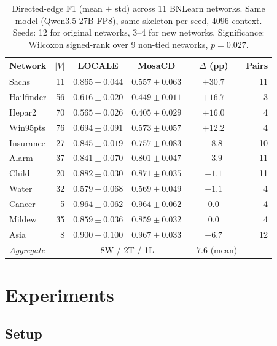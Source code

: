 \documentclass{article} %
\begin{document}
\begin{table}[t]
\centering
\caption{Directed-edge F1 (mean $\pm$ std) across 11 BNLearn networks. Same model (Qwen3.5-27B-FP8), same skeleton per seed, 4096 context. Seeds: 12 for original networks, 3--4 for new networks. Significance: Wilcoxon signed-rank over 9 non-tied networks, $p{=}0.027$.}
\label{tab:main}
\small
\begin{tabular}{lrcccr}
\toprule
Network & $|V|$ & LOCALE & MosaCD & $\Delta$ (pp) & Pairs \\
\midrule
Sachs     & 11 & $\mathbf{0.865 \pm 0.044}$ & $0.557 \pm 0.063$ & $+30.7$ & 11 \\
Hailfinder & 56 & $\mathbf{0.616 \pm 0.020}$ & $0.449 \pm 0.011$ & $+16.7$ & 3 \\
Hepar2    & 70 & $\mathbf{0.565 \pm 0.026}$ & $0.405 \pm 0.029$ & $+16.0$ & 4 \\
Win95pts  & 76 & $\mathbf{0.694 \pm 0.091}$ & $0.573 \pm 0.057$ & $+12.2$ & 4 \\
Insurance & 27 & $\mathbf{0.845 \pm 0.019}$ & $0.757 \pm 0.083$ & $+8.8$  & 10 \\
Alarm     & 37 & $\mathbf{0.841 \pm 0.070}$ & $0.801 \pm 0.047$ & $+3.9$  & 11 \\
Child     & 20 & $\mathbf{0.882 \pm 0.030}$ & $0.871 \pm 0.035$ & $+1.1$  & 11 \\
Water     & 32 & $\mathbf{0.579 \pm 0.068}$ & $0.569 \pm 0.049$ & $+1.1$  & 4 \\
Cancer    & 5  & $\mathbf{0.964 \pm 0.062}$ & $\mathbf{0.964 \pm 0.062}$ & $0.0$   & 4 \\
Mildew    & 35 & $\mathbf{0.859 \pm 0.036}$ & $\mathbf{0.859 \pm 0.032}$ & $0.0$   & 4 \\
Asia      & 8  & $0.900 \pm 0.100$ & $\mathbf{0.967 \pm 0.033}$ & $-6.7$  & 12 \\
\midrule
\multicolumn{2}{l}{\textit{Aggregate}} & \multicolumn{2}{c}{8W / 2T / 1L} & $+7.6$ (mean) & \\
\bottomrule
\end{tabular}
\end{table}

\section{Experiments}

\subsection{Setup}
\end{document}
